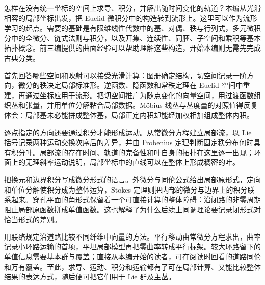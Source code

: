 
% 

\BookPartGuide

怎样在没有统一坐标的空间上求导、积分，并解出随时间变化的轨道？本编从光滑相容的局部坐标出发，把 Euclid 微积分中的构造转到流形上。这里可以作为流形学习的起点。需要的基础是有限维线性代数中的基、对偶、秩与行列式，多元微积分中的全微分、链式法则与积分，以及开集、连续性、同胚、子空间和乘积等基本拓扑概念。前三编提供的曲面经验可以帮助理解这些构造，开始本编则无需先完成古典分类。

\ProseParagraphBreak

首先回答哪些空间和映射可以接受光滑计算：图册确定结构，切空间记录一阶方向，微分的秩决定局部标准形。逆函数、隐函数和常秩定理在 Euclid 空间中重建，再通过坐标应用于流形。把切空间推广为随点变化的向量空间，用过渡函数组织丛和张量，并用单位分解粘合局部数据。Möbius 线丛与丛度量的对照值得反复体会：局部基未必能拼成整体基，局部正定内积却能经加权相加组成整体内积。

\ProseParagraphBreak

逐点指定的方向还要通过积分才能形成运动。从常微分方程建立局部流，以 Lie 括号记录两种运动交换次序后的差异，并由 Frobenius 定理判断固定秩分布何时具有积分叶。局部流的存在时间、轨道的完备性和叶自身的拓扑在这里逐一出现；环面上的无理斜率运动说明，局部坐标中的直线可以在整体上形成稠密的叶。

\ProseParagraphBreak

把换元和边界积分写成微分形式的语言。外微分与同伦公式给出局部原形式，定向和单位分解使积分成为整体运算，Stokes 定理则把内部的微分与边界上的积分联系起来。穿孔平面的角形式保留着一个可直接计算的整体障碍：沿闭路的非零周期阻止局部原函数拼成单值函数。这也解释了为什么后续上同调理论要记录闭形式对恰当形式的差别。

\ProseParagraphBreak

用联络规定沿道路比较不同纤维中向量的方法。平行移动由常微分方程求出，曲率记录小环路运输的首项，平坦局部模型再把零曲率转成平行标架。较大环路留下的单值信息需要基本群与覆盖；直接从本编开始的读者，可在阅读时回看的道路同伦和万有覆盖。至此，求导、运动、积分和运输都有了可在局部计算、又能比较整体结果的表达方式，随后便可把它们用于 Lie 群及主丛。







